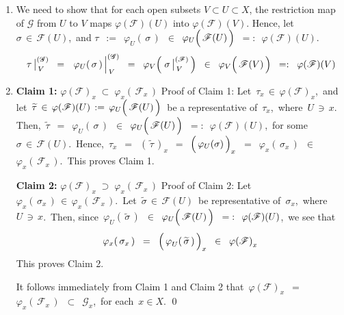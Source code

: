\begin{enumerate}
\item
	We need to show that for each open subsets $V \subset U \subset X$,
	the restriction map of $\mathscr{G}$ from $U$ to $V$ maps
	$\varphi(\mathscr{F})(U)$ into $\varphi(\mathscr{F})(V)$.
	Hence, let \,$\sigma \,\in\, \mathscr{F}(U)$,\, and
	$\tau$
	\,$:=$\, $\varphi_{U}(\,\sigma\,)$
	\,$\in$\, $\varphi_{U}\!\left(\,\overset{{\color{white}.}}{\mathscr{F}(U)}\,\right)$
	\,$=:$\, $\varphi(\mathscr{F})(U)$.
	\begin{equation*}
	\left.\overset{{\color{white}.}}{\tau}\,\right\vert^{(\mathscr{G})}_{\,V}
	\;\; = \;\;
		\left.\overset{{\color{white}.}}{\varphi_{U}(\,\sigma\,)}\,\right\vert^{(\mathscr{G})}_{\,V}
	\;\; = \;\;
		\varphi_{V}\!\left(\,
			\left.\overset{{\color{white}.}}{\sigma}\,\right\vert^{(\mathscr{F})}_{\,V}
			\,\right)
	\;\; \in \;\;
		\varphi_{V}\!\left(\,\overset{{\color{white}.}}{\mathscr{F}(V)}\,\right)
	\;\; =: \;\;
		\varphi(\mathscr{F})(V)
	\end{equation*}
\item
	\textbf{Claim 1:}\;\; $\varphi(\mathscr{F})_{x} \;\subset\; \varphi_{x}(\,\mathscr{F}_{x}\,)$
	\vskip 0.2cm
	Proof of Claim 1:\quad
	Let \,$\tau_{x} \,\in\, \mathscr{\varphi}(\mathscr{F})_{x}$,\, and
	let \,$\widetilde{\tau} \,\in\, \varphi(\mathscr{F})(U) \,:=\, \varphi_{U}\!\left(\,\overset{{\color{white}.}}{\mathscr{F}(U)}\,\right)$\,
	be a representative of \,$\tau_{x}$,\, where \,$U \,\ni\, x$.\,
	Then, \,$\widetilde{\tau}$
	\,$=$\, $\varphi_{U}(\,\sigma\,)$
	\,$\in$\, $\varphi_{U}\!\left(\,\overset{{\color{white}.}}{\mathscr{F}(U)}\,\right)$
	\,$=:$\, $\varphi(\mathscr{F})(U)$,\,
	for some \,$\sigma \,\in\, \mathscr{F}(U)$.\,
	Hence,
	\,$\tau_{x}$
	\,$=$\, $\left(\,\widetilde{\tau}\,\right)_{x}$
	\,$=$\, $\left(\,\overset{{\color{white}.}}{\varphi_{U}(\sigma)}\,\right)_{x}$
	\,$=$\, $\varphi_{x}(\,\sigma_{x}\,)$
	\,$\in$\, $\varphi_{x}\!\left(\,\mathscr{F}_{x}\,\right)$.\,
	This proves Claim 1.
	
	\vskip 0.5cm
	\textbf{Claim 2:}\;\; $\varphi(\mathscr{F})_{x} \;\supset\; \varphi_{x}(\,\mathscr{F}_{x}\,)$
	\vskip 0.2cm
	Proof of Claim 2:\quad
	Let \,$\varphi_{x}(\,\sigma_{x}\,) \,\in\, \varphi_{x}(\,\mathscr{F}_{x}\,)$.\,
	Let \,$\widetilde{\sigma} \,\in\, \mathscr{F}(U)$\, be representative of \,$\sigma_{x}$,\,
	where \,$U \,\ni\, x$.\,
	Then, since
	\,$\varphi_{U}(\,\widetilde{\sigma}\,)$
	\,$\in$\, $\varphi_{U}\!\left(\,\mathscr{F}(\overset{{\color{white}.}}{U})\,\right)$
	\,$=:$\, $\overset{{\color{white}.}}{\varphi(\mathscr{F})(U)}$,\,
	we see that
	\begin{equation*}
	\varphi_{x}(\,\sigma_{x}\,)
	\;\; = \;\;
		\left(\,\overset{{\color{white}1}}{\varphi}_{U}(\,\widetilde{\sigma}\,)\,\right)_{x}
	\;\; \in \;\;
		\overset{{\color{white}.}}{\varphi(\mathscr{F})}_{x}
	\end{equation*}
	This proves Claim 2.
	
	\vskip 0.3cm
	\noindent
	It follows immediately from Claim 1 and Claim 2 that
	\,$\varphi(\mathscr{F})_{x}$
	\,$=$\, $\varphi_{x}\!\left(\,\mathscr{F}_{x}\,\right)$
	\,$\subset$\, $\mathscr{G}_{x}$,\,
	for each \,$x \in X$.
	\qed
\end{enumerate}


